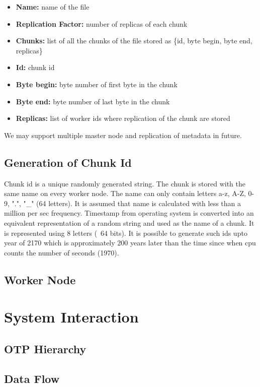 \documentclass[a4paper,12pt]{article}
\begin{document}
\begin{itemize}
\item \textbf{Name:} name of the file
\item \textbf{Replication Factor:} number of replicas of each chunk
\item \textbf{Chunks:} list of all the chunks of the file stored as \{id, byte begin, byte end, replicas\}
\item \textbf{Id:} chunk id
\item \textbf{Byte begin:} byte number of first byte in the chunk
\item \textbf{Byte end:} byte number of last byte in the chunk
\item \textbf{Replicas:} list of worker ids where replication of the chunk are stored
\end{itemize}

We may support multiple master node and replication of metadata in future.

\subsection{Generation of Chunk Id}
Chunk id is a unique randomly generated string. The chunk is stored with the same name on every worker node. The name can only contain letters a-z, A-Z, 0-9, ".", "\_" (64 letters). It is assumed that name is calculated with less than a million per sec frequency.  Timestamp from operating system is converted into an equivalent representation of a random string and used as the name of a chunk. It is represented using 8 letters (~64 bits). It is possible to generate such ids upto year of 2170 which is approximately 200 years later than the time since when cpu counts the number of seconds (1970).

\subsection{Worker Node}


\section{System Interaction}
\subsection{OTP Hierarchy}
\subsection{Data Flow}
\end{document}
